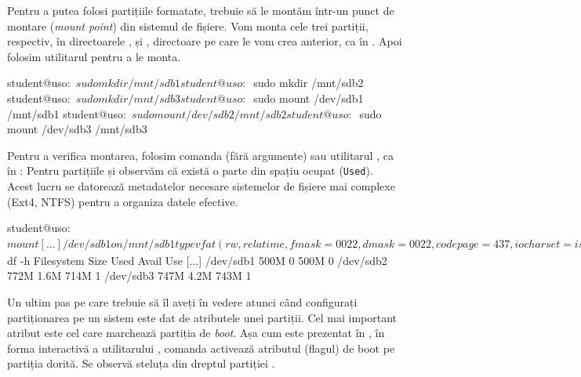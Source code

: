 Pentru a putea folosi partițiile formatate, trebuie să le montăm într-un punct de montare (\textit{mount point}) din sistemul de fișiere.
Vom monta cele trei partiții, respectiv, în directoarele ,  și , directoare pe care le vom crea anterior, ca în .
Apoi folosim utilitarul  pentru a le monta.

\begin{screen}[caption={Montarea partițiilor},label={lst:storage:mount}]
student@uso:~$ sudo mkdir /mnt/sdb1
student@uso:~$ sudo mkdir /mnt/sdb2
student@uso:~$ sudo mkdir /mnt/sdb3
student@uso:~$ sudo mount /dev/sdb1 /mnt/sdb1
student@uso:~$ sudo mount /dev/sdb2 /mnt/sdb2
student@uso:~$ sudo mount /dev/sdb3 /mnt/sdb3
\end{screen}

Pentru a verifica montarea, folosim comanda  (fără argumente) sau utilitarul , ca în :
Pentru partițiile  și  observăm că există o parte din spațiu ocupat (\texttt{Used}).
Acest lucru se datorează metadatelor necesare sistemelor de fișiere mai complexe (Ext4, NTFS) pentru a organiza datele efective.

\begin{screen}[caption={Afișarea partițiilor montate},label={lst:storage:list-mounts}]
student@uso:~$ mount
[...]
/dev/sdb1 on /mnt/sdb1 type vfat (rw,relatime,fmask=0022,dmask=0022,codepage=437,iocharset=iso8859-1,shortname=mixed,errors=remount-ro)
/dev/sdb2 on /mnt/sdb2 type ext4 (rw,relatime,data=ordered)
/dev/sdb3 on /mnt/sdb3 type fuseblk (rw,relatime,user_id=0,group_id=0,allow_other,blksize=4096)
student@uso:~$ df -h
Filesystem      Size  Used Avail Use%
[...]
/dev/sdb1       500M     0  500M   0%
/dev/sdb2       772M  1.6M  714M   1%
/dev/sdb3       747M  4.2M  743M   1%
\end{screen}

Un ultim pas pe care trebuie să îl aveți în vedere atunci când configurați partiționarea pe un sistem este dat de atributele unei partiții.
Cel mai important atribut este cel care marchează partiția de \textit{boot}.
Așa cum este prezentat în , în forma interactivă a utilitarului , comanda  activează atributul (flagul) de boot pe partiția dorită. Se observă steluța din dreptul partiției .

